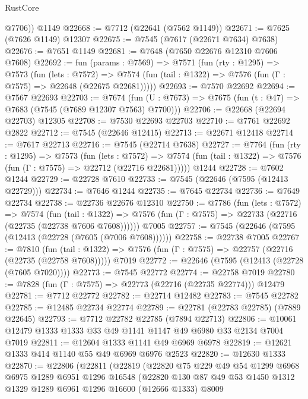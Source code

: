 \begin{lexlean}{RustCore}
\begin{coremodule}
        @7706))
    @1149
@22668 := @7712 (@22641 (@7562 @1149))
@22671 := @7625 (@7626 @1149) @12307
@22675 := @7545 (@7617 (@22671 @7634) @7638)
@22676 := @7651 @1149
@22681 := @7648 (@7650 @22676 @12310 @7606 @7608)
@22692 := fun (params : @7569) =>
  @7571
    (fun (rty : @1295) =>
    @7573
      (fun (lets : @7572) =>
      @7574 (fun (tail : @1322) => @7576 (fun (Γ : @7575) => @22648 (@22675 @22681)))))
@22693 := @7570 @22692
@22694 := @7567 @22693
@22703 := @7674
    (fun (U : @7673) => @7675 (fun (t : @47) => @7683 (@7545 (@7689 @12307 @7563) @7700)))
@22706 := @22668 (@22694 @22703) @12305
@22708 := @7530 @22693 @22703
@22710 := @7761 @22692 @2822
@22712 := @7545 (@22646 @12415)
@22713 := @22671 @12418
@22714 := @7617 @22713
@22716 := @7545 (@22714 @7638)
@22727 := @7764
    (fun (rty : @1295) =>
    @7573
      (fun (lets : @7572) =>
      @7574 (fun (tail : @1322) => @7576 (fun (Γ : @7575) => @22712 (@22716 @22681)))))
    @1244
@22728 := @7602 @1244
@22729 := @22728 @7610
@22733 := @7545 (@22646 (@7595 (@12413 @22729)))
@22734 := @7646 @1244
@22735 := @7645 @22734
@22736 := @7649 @22734
@22738 := @22736 @22676 @12310
@22750 := @7786
    (fun (lets : @7572) =>
    @7574
      (fun (tail : @1322) =>
      @7576 (fun (Γ : @7575) => @22733 (@22716 (@22735 (@22738 @7606 @7608))))))
    @7005
@22757 := @7545 (@22646 (@7595 (@12413 (@22728 (@7605 (@7006 @7608))))))
@22758 := @22738 @7005
@22767 := @7810
    (fun (tail : @1322) => @7576 (fun (Γ : @7575) => @22757 (@22716 (@22735 (@22758 @7608)))))
    @7019
@22772 := @22646 (@7595 (@12413 (@22728 (@7605 @7020))))
@22773 := @7545 @22772
@22774 := @22758 @7019
@22780 := @7828 (fun (Γ : @7575) => @22773 (@22716 (@22735 @22774))) @12479
@22781 := @7712 @22772
@22782 := @22714 @12482
@22783 := @7545 @22782
@22785 := @12485 @22734 @22774
@22789 := @22781 (@22783 @22785) (@7889 @22645)
@22793 := @7712 @22782 @22785 (@7894 @22713)
@22806 := @10061 @12479 @1333 @1333 @33 @49 @1141 @1147 @49 @6980 @33 @2134 @7004 @7019
@22811 := @12604 @1333 @1141 @49 @6969 @6978
@22819 := @12621 @1333 @414 @1140 @55 @49 @6969 @6976 @2523
@22820 := @12630 @1333
@22870 := @22806
    (@22811
      (@22819
        (@22820
          @75
          @229
          @49
          @54
          @1299
          @6968
          @6975
          @1289
          @6951
          @1296
          @16548
          (@22820
            @130
            @87
            @49
            @53
            @1450
            @1312
            @1329
            @1289
            @6961
            @1296
            @16600
            (@12666 @1333)
            @8009

\end{coremodule}
\end{lexlean}
